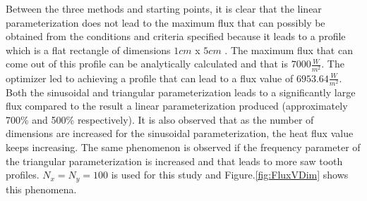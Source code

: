 \documentclass{article}
\begin{document}
Between the three methods and starting points, it is clear that the linear parameterization does not lead to the maximum flux that can possibly be obtained from the conditions and criteria specified because it leads to a profile which is a flat rectangle of dimensions $1cm$ x $5cm$ . The maximum flux that can come out of this profile can be analytically calculated and that is $7000 \frac{W}{m^2}$. The optimizer led to achieving a profile that can lead to a flux value of $6953.64 \frac{W}{m^2}$. \\
Both the sinusoidal and triangular parameterization leads to a significantly large flux compared to the result a linear parameterization produced (approximately 700\% and 500\% respectively). It is also observed that as the number of dimensions are increased for the sinusoidal parameterization, the heat flux value keeps increasing. The same phenomenon is observed if the frequency parameter of the triangular parameterization is increased and that leads to more saw tooth profiles. $N_x = N_y = 100$ is used for this study and Figure.\ref{fig:FluxVDim} shows this phenomena. 
\end{document}
